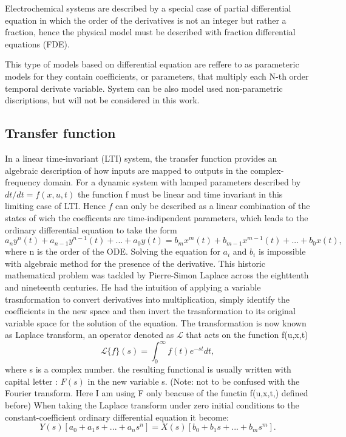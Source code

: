 Electrochemical systems are described by a special case of partial differential equation in which the order of the derivatives is not an integer but rather a fraction, hence the physical model must be described with fraction differential equations (FDE).

This type of models based on differential equation are reffere to as parameteric models for they contain coefficients, or parameters, that multiply each N-th order temporal derivate variable. System can be also model used non-parametric discriptions, but will not be considered in this work.

\subsection{Transfer function}

In a linear time‐invariant (LTI) system, the transfer function provides an algebraic description of how inputs are mapped to outputs in the complex‐frequency domain. For a dynamic system with lamped parameters described by $dt/dt=f(x,u,t)$ the function f must be linear and time invariant in this limiting case of LTI. Hence $f$ can only be described as a linear combination of the states of wich the coefficents are time-indipendent parameters, which leads to the ordinary differential equation to take the form
$$
a_n y^n (t) + a_{n-1} y^{n-1} (t) + ... + a_0 y(t)  =  b_m x^m (t) + b_{m-1} x^{m-1} (t) + ... + b_0 x(t),  
$$
where n is the order of the ODE.
Solving the equation for $a_i$ and $b_i$ is impossible with algebraic method for the presence of the derivative. This historic mathematical problem was tackled by Pierre-Simon Laplace across the eighttenth and nineteenth centuries. He had the intuition of applying a variable trasnformation to convert derivatives into multiplication, simply identify the coefficients in the new space and then invert the trasnformation to its original variable space for the solution of the equation. The transformation is now known as Laplace transform, an operator denoted as $\mathcal{L}$ that acts on the function f(u,x,t)
$$
\mathcal{L}\{f\}(s) = \int_0^\infty f(t)e^{-st}dt,
$$
where s is a complex number.
the resulting functional is usually written with capital letter : $F(s)$ in the new variable s. (Note: not to be confused with the Fourier transform. Here I am using F only beacuse of the functin f(u,x,t,) defined before)
When taking the Laplace transform under zero initial conditions to the constant-coefficient ordinary differential equation it become: 
$$
Y(s)[a_0 + a_1 s + ... + a_n s^n] = X(s)[b_0 + b_1 s + ... + b_m s^m].  
$$
